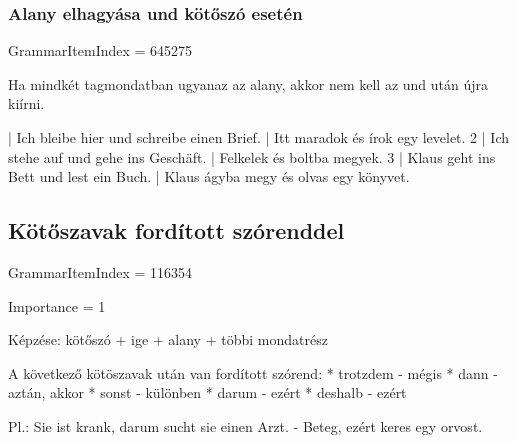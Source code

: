 \documentclass{article}
\newenvironment{desc}{\verbatim}{\endverbatim}
\newenvironment{exmp}{\verbatim}{\endverbatim}
\begin{document}
\subsubsection{Alany elhagyása und kötőszó esetén}

GrammarItemIndex = 645275

\begin{desc}
Ha mindkét tagmondatban ugyanaz az alany, akkor nem kell az und után újra kiírni.
\end{desc}

\begin{exmp}
1 | Ich bleibe hier und schreibe einen Brief. | Itt maradok és írok egy levelet.
2 | Ich stehe auf und gehe ins Geschäft. | Felkelek és boltba megyek.
3 | Klaus geht ins Bett und lest ein Buch. | Klaus ágyba megy és olvas egy könyvet.
\end{exmp}

\subsection{Kötőszavak fordított szórenddel}

GrammarItemIndex = 116354

Importance = 1

\begin{desc}
Képzése: kötőszó + ige + alany + többi mondatrész

A következő kötöszavak után van fordított szórend:
* trotzdem - mégis
* dann - aztán, akkor
* sonst - különben
* darum - ezért
* deshalb - ezért

Pl.: Sie ist krank, darum sucht sie einen Arzt. - Beteg, ezért keres egy orvost.
\end{desc}
\end{document}
